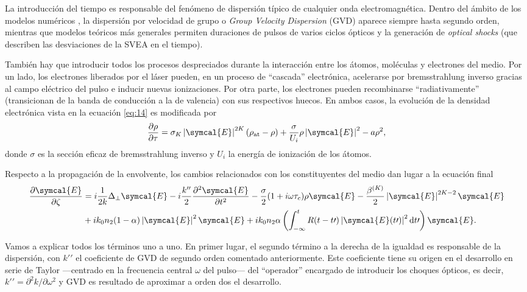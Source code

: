 \documentclass{scrartcl} %
\newcommand*{\pdv}[2]{\frac{\partial#1}{\partial#2}}
\newcommand*{\pdvN}[3]{\frac{\partial^{#3}#1}{\partial{#2}^{#3}}}
\newcommand*{\diff}{\operatorname{d}\!}
\newcommand*{\laplacian}{\Delta}
\newcommand*{\abs}[1]{\left|#1\right|}
\begin{document}
La introducción del tiempo es responsable del fenómeno de dispersión típico de cualquier onda electromagnética. Dentro del ámbito de los modelos numéricos \cite{Kolesik2004, Kolesik2001, Mlejnek1998, Mlejnek1999}, la dispersión por velocidad de grupo o \emph{Group Velocity Dispersion} (GVD) aparece siempre hasta segundo orden, mientras que modelos teóricos más generales \cite{Brabec2000, Couairon2006b} permiten duraciones de pulsos de varios ciclos ópticos y la generación de \emph{optical shocks} (que describen las desviaciones de la SVEA en el tiempo).

También hay que introducir todos los procesos despreciados durante la interacción entre los átomos, moléculas y electrones del medio. Por un lado, los electrones liberados por el láser pueden, en un proceso de \enquote{cascada} electrónica, acelerarse por bremsstrahlung inverso gracias al campo eléctrico del pulso e inducir nuevas ionizaciones. Por otra parte, los electrones pueden recombinarse \enquote{radiativamente} (transicionan de la banda de conducción a la de valencia) con sus respectivos huecos. En ambos casos, la evolución de la densidad electrónica vista en la ecuación \eqref{eq:14} es modificada por \cite{Mlejnek1998, Couairon2006b}
\begin{equation}\label{eq:15}
  \pdv{\rho}{\tau} = \sigma_{K}\abs{\symcal{E}}^{2K}(\rho_{\mathrm{at}} - \rho) + \frac{\sigma}{U_{i}} \rho \abs{\symcal{E}}^{2} - a \rho^{2},
\end{equation}
donde $\sigma$ es la sección eficaz de bremsstrahlung inverso y $U_{i}$ la energía de ionización de los átomos.

Respecto a la propagación de la envolvente, los cambios relacionados con los constituyentes del medio dan lugar a la ecuación final
\begin{equation}\label{eq:16}
  \begin{split}
    \pdv{\symcal{E}}{\zeta} & = i \frac{1}{2k} \laplacian_{\perp}\symcal{E} - i \frac{k^{\prime \prime}}{2}\pdvN{\symcal{E}}{t}{2} - \frac{\sigma}{2}(1 + i \omega \tau_{c}) \rho \symcal{E} - \frac{\beta^{(K)}}{2}\abs{\symcal{E}}^{2K-2}\symcal{E} \\
    & + i k_{0}n_{2}(1-\alpha)\abs{\symcal{E}}^{2}\symcal{E} + i k_{0}n_{2} \alpha \left(\int_{-\infty}^{t}R(t-t \prime)\abs{\symcal{E}(t \prime )}^{2} \diff t \prime\right)\symcal{E}.
  \end{split}
\end{equation}

Vamos a explicar todos los términos uno a uno. En primer lugar, el segundo término a la derecha de la igualdad es responsable de la dispersión, con $k \prime \prime$ el coeficiente de GVD de segundo orden comentado anteriormente. Este coeficiente tiene su origen en el desarrollo en serie de Taylor ---centrado en la frecuencia central $\omega$ del pulso--- del \enquote{operador} encargado de introducir los choques ópticos, es decir, $k \prime \prime = \partial^{2}k/\partial \omega^{2}$ y GVD es resultado de aproximar a orden dos el desarrollo.
\end{document}
